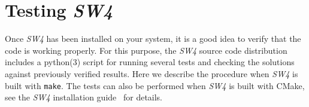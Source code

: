 \documentclass[11pt]{report}
\begin{document}


\appendix

\chapter{Testing \emph{SW4}}\label{cha:testing-sw4}

Once \emph{SW4} has been installed on your system, it is a good idea to verify that the code is
working properly. For this purpose, the \emph{SW4} source code distribution includes a python(3)
script for running several tests and checking the solutions against previously verified
results. Here we describe the procedure when \emph{SW4} is built with {\tt make}. The tests can also
be performed when \emph{SW4} is built with CMake, see the \emph{SW4} installation
guide~\cite{SW4-install} for details.
\end{document}

